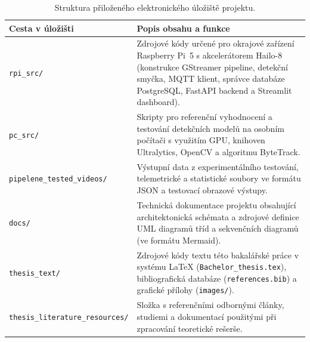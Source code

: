 \documentclass[male,czech,api_bc]{kitheses}
\renewcommand{\arraystretch}{1.23}
\begin{document}
\begin{table}[H]
    \centering
    \renewcommand{\arraystretch}{1.3}
    \begin{tabular}{|l|p{9.5cm}|}
        \hline
        \textbf{Cesta v úložišti} & \textbf{Popis obsahu a funkce} \\ \hline
        \texttt{rpi\_src/} & Zdrojové kódy určené pro okrajové zařízení Raspberry Pi~5 s akcelerátorem Hailo-8 (konstrukce GStreamer pipeline, detekční smyčka, MQTT klient, správce databáze PostgreSQL, FastAPI backend a Streamlit dashboard). \\ \hline
        \texttt{pc\_src/} & Skripty pro referenční vyhodnocení a testování detekčních modelů na osobním počítači s využitím GPU, knihoven Ultralytics, OpenCV a algoritmu ByteTrack. \\ \hline
        \texttt{pipelene\_tested\_videos/} & Výstupní data z experimentálního testování, telemetrické a statistické soubory ve formátu JSON a testovací obrazové výstupy. \\ \hline
        \texttt{docs/} & Technická dokumentace projektu obsahující architektonická schémata a zdrojové definice UML diagramů tříd a sekvenčních diagramů (ve formátu Mermaid). \\ \hline
        \texttt{thesis\_text/} & Zdrojové kódy textu této bakalářské práce v systému \LaTeX{} (\texttt{Bachelor\_thesis.tex}), bibliografická databáze (\texttt{references.bib}) a grafické přílohy (\texttt{images/}). \\ \hline
        \texttt{thesis\_literature\_resources/} & Složka s referenčními odbornými články, studiemi a dokumentací použitými při zpracování teoretické rešerše. \\ \hline
    \end{tabular}
    \caption{Struktura přiloženého elektronického úložiště projektu.}
    \label{tab:repo_structure}
\end{table}


\end{document}
